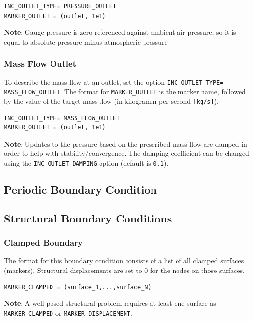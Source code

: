 \documentclass[12pt, a4paper, twoside]{article}
\begin{document}
\begin{lstlisting}
INC_OUTLET_TYPE= PRESSURE_OUTLET
MARKER_OUTLET = (outlet, 1e1)
\end{lstlisting}

\textbf{Note}: Gauge pressure is zero-referenced against ambient air pressure, so it is equal to absolute pressure minus atmospheric pressure

\subsubsection{Mass Flow Outlet}
To describe the mass flow at an outlet, set the option \texttt{INC\_OUTLET\_TYPE= MASS\_FLOW\_OUTLET}. The format for \verb|MARKER_OUTLET| is the marker name, followed by the value of the target mass flow (in kilogramm per second \verb|[kg/s]|).

\begin{lstlisting}
INC_OUTLET_TYPE= MASS_FLOW_OUTLET
MARKER_OUTLET = (outlet, 1e1)
\end{lstlisting}

\textbf{Note}: Updates to the pressure based on the prescribed mass flow are damped in order to help with stability/convergence. The damping coefficient can be changed using the \verb|INC_OUTLET_DAMPING| option (default is \verb|0.1|).


\subsection{Periodic Boundary Condition}
\subsection{Structural Boundary Conditions}
\subsubsection{Clamped Boundary}
The format for this boundary condition consists of a list of all clamped surfaces (markers). Structural displacements are set to 0 for the nodes on those surfaces.

\begin{lstlisting}
MARKER_CLAMPED = (surface_1,...,surface_N)
\end{lstlisting}

\textbf{Note}: A well posed structural problem requires at least one surface as\\ \verb|MARKER_CLAMPED| or \verb|MARKER_DISPLACEMENT|.
\end{document}
